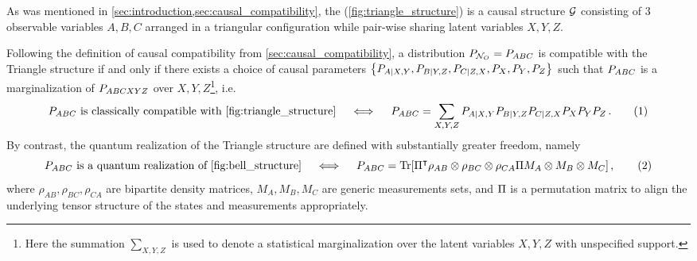 \documentclass[aps, 10pt, english, twoside, pra, nofootinbib, tightenlines, longbibliography, superscriptaddress]{revtex4-1}
\begin{document}
    As was mentioned in \cref{sec:introduction,sec:causal_compatibility}, the  (\cref{fig:triangle_structure}) is a causal structure $\mathcal{G}$ consisting of $3$ observable variables $A, B, C$ arranged in a triangular configuration while pair-wise sharing latent variables $X, Y, Z$.

    Following the definition of causal compatibility from \cref{sec:causal_compatibility}, a distribution $\prob[\nodes_{O}] = \prob[ABC]$ is compatible with the Triangle structure if and only if there exists a choice of causal parameters $\bc{\prob[A|X,Y],\prob[B|Y,Z],\prob[C|Z,X],\prob[X],\prob[Y],\prob[Z]}$ such that $\prob[ABC]$ is a marginalization of $\prob[ABCXYZ]$ over $X, Y, Z$\footnote{Here the summation $\sum_{X,Y,Z}$ is used to denote a statistical marginalization over the latent variables $X,Y,Z$ with unspecified support.}, i.e.
    \[ \prob[ABC] \text{ is classically compatible with \cref{fig:triangle_structure}} \quad\iff\quad\prob[ABC] = \sum_{X,Y,Z}\prob[A|X,Y]\prob[B|Y,Z]\prob[C|Z,X]\prob[X]\prob[Y]\prob[Z]\,. \eq \label{eq:triangle_compatibility} \]
    By contrast, the quantum realization of the Triangle structure are defined with substantially greater freedom, namely
    \[ \prob[ABC] \text{ is a quantum realization of \cref{fig:bell_structure}} \quad\iff\quad\prob[ABC] = \Tr\bs{\netperm^\intercal \rho_{AB}\otimes\rho_{BC}\otimes\rho_{CA} \netperm M_{A}\otimes M_{B} \otimes M_{C}}\,, \eq \label{eq:triangle_Qcompatibility} \]
    where $\rho_{AB}, \rho_{BC}, \rho_{CA}$ are bipartite density matrices, $M_{A}, M_{B}, M_{C}$ are generic measurements sets, and $\Pi$ is a permutation matrix to align the underlying tensor structure of the states and measurements appropriately.
\end{document}
